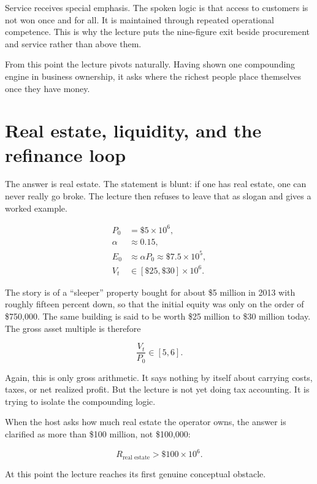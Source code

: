 Service receives special emphasis. The spoken logic is that access to customers is not won once and for all. It is maintained through repeated operational competence. This is why the lecture puts the nine-figure exit beside procurement and service rather than above them.

From this point the lecture pivots naturally. Having shown one compounding engine in business ownership, it asks where the richest people place themselves once they have money.

\section{Real estate, liquidity, and the refinance loop}

The answer is real estate. The statement is blunt: if one has real estate, one can never really go broke. The lecture then refuses to leave that as slogan and gives a worked example.

\begin{align}
P_0 &= \$5 \times 10^6,\\
\alpha &\approx 0.15,\\
E_0 &\approx \alpha P_0 \approx \$7.5 \times 10^5,\\
V_t &\in [\$25,\$30] \times 10^6.
\end{align}

The story is of a ``sleeper'' property bought for about \$5 million in 2013 with roughly fifteen percent down, so that the initial equity was only on the order of \$750{,}000. The same building is said to be worth \$25 million to \$30 million today. The gross asset multiple is therefore

\begin{equation}
\frac{V_t}{P_0} \in [5,6].
\end{equation}

Again, this is only gross arithmetic. It says nothing by itself about carrying costs, taxes, or net realized profit. But the lecture is not yet doing tax accounting. It is trying to isolate the compounding logic.

When the host asks how much real estate the operator owns, the answer is clarified as more than \$100 million, not \$100{,}000:

\begin{equation}
R_{\text{real estate}} > \$100 \times 10^6.
\end{equation}

At this point the lecture reaches its first genuine conceptual obstacle.

